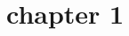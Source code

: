 \documentclass{article}
\title{}
\author{}
\date{}
\begin{document}
\maketitle
\newpage
\section{chapter 1}
\end{document}
